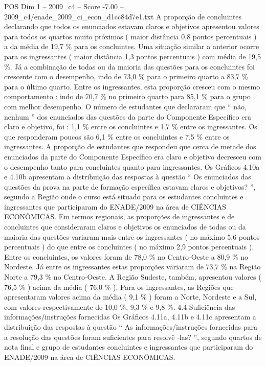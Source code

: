 \begin{textsample}{POS Dim 1 – 2009\_c4 – Score -7.00 – 2009\_c4/enade\_2009\_ci\_econ\_d1cc84d7e1.txt}
A proporção de concluintes declarando que todos os enunciados estavam claros e objetivos apresentou valores para todos os quartos muito próximos ( maior distância 0,8 pontos percentuais ) a da média de 19,7 \% para os concluintes.
Uma situação similar a anterior ocorre para os ingressantes ( maior distância 1,3 pontos percentuais ) com média de 19,5 \%.
Já a combinação de todas ou da maioria das questões para os concluintes foi crescente com o desempenho, indo de 73,0 \% para o primeiro quarto a 83,7 \% para o último quarto.
Entre os ingressantes, esta proporção cresceu com o mesmo comportamento : indo de 70,7 \% no primeiro quarto para 85,1 \% para o grupo com melhor desempenho.
O número de estudantes que declararam que “ não, nenhum ” dos enunciados das questões da parte do Componente Específico era claro e objetivo, foi : 1,1 \% entre os concluintes e 1,7 \% entre os ingressantes.
Os que responderam poucos são 6,1 \% entre os concluintes e 7,5 \% entre os ingressantes.
A proporção de estudantes que respondeu que cerca de metade dos enunciados da parte do Componente Específico era claro e objetivo decresceu com o desempenho tanto para concluintes quanto para ingressantes.
Os Gráficos 4.10a e 4.10b apresentam a distribuição das respostas à questão “ Os enunciados das questões da prova na parte de formação específica estavam claros e objetivos? ”, segundo a Região onde o curso está situado para os estudantes concluintes e ingressantes que participaram do ENADE/2009 na área de CIÊNCIAS ECONÔMICAS.
Em termos regionais, as proporções de ingressantes e de concluintes que consideraram claros e objetivos os enunciados de todas ou da maioria das questões variaram mais entre os ingressantes ( no máximo 5,6 pontos percentuais ) do que entre os concluintes ( no máximo 2,9 pontos percentuais ).
Entre os concluintes, os valores foram de 78,0 \% no Centro-Oeste a 80,9 \% no Nordeste.
Já entre os ingressantes estas proporções variaram de 73,7 \% na Região Norte a 79,3 \% no Centro-Oeste.
A Região Sudeste, também, apresentou valores ( 76,5 \% ) acima da média ( 76,0 \% ).
Para os ingressantes, as Regiões que apresentaram valores acima da média ( 9,1 \% ) foram a Norte, Nordeste e a Sul, com valores respectivamente de 10,0 \%, 9,3 \% e 9,8 \%. 4.4 Suficiência das informações/instruções fornecidas Os Gráficos 4.11a, 4.11b e 4.11c apresentam a distribuição das respostas à questão “ As informações/instruções fornecidas para a resolução das questões foram suficientes para resolvê -las? ”, segundo quartos de nota final e grupo de estudantes concluintes e ingressantes que participaram do ENADE/2009 na área de CIÊNCIAS ECONÔMICAS.

\end{textsample}
